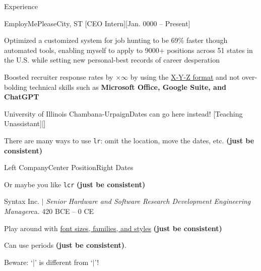 \documentclass[9pt]{extarticle} %
\begin{document}
\begin{sectionList}{Experience}
    \item \lr
    {EmployMePlease}{City, ST}
    [CEO Intern][Jan. 0000 -- Present]
    \begin{bullets}
        \item Optimized a customized system for job hunting to be 69\% faster though automated tools, enabling myself to apply to 9000+ positions across 51 states in the U.S. while setting new personal-best records of career desperation
        \item Boosted recruiter response rates by $\times \infty$ by using the \href{https://www.inc.com/bill-murphy-jr/google-recruiters-say-these-5-resume-tips-including-x-y-z-formula-will-improve-your-odds-of-getting-hired-at-google.html}{X-Y-Z format} and not over-bolding technical skills such as \textbf{Microsoft Office, Google Suite, and ChatGPT}
    \end{bullets}

    \item \lr
    {University of Illinois Chambana-Urpaign}{\textnormal{Dates can go here instead!}}
    [Teaching Unassistant][]
    \begin{bullets}
        \item There are many ways to use \texttt{lr}: omit the location, move the dates, etc. \textbf{(just be consistent)}
    \end{bullets}

    \item \lcr
    {Left Company}{Center Position}{Right Dates}
    \begin{bullets}
        \item Or maybe you like \texttt{lcr} \textbf{(just be consistent)}
    \end{bullets}

    \item \lr
    {Syntax Inc. $|$ \textnormal{\textit{Senior Hardware and Software Research Development Engineering Manager}}}{ca. 420 BCE -- 0 CE}
    \begin{bullets}
        \item Play around with \href{https://www.overleaf.com/learn/latex/Font_sizes%2C_families%2C_and_styles}{font sizes, families, and styles} \textbf{(just be consistent)}
        \item Can use periods \textbf{(just be consistent)}.
        \item Beware: `|' is different from `$\vert$'!
    \end{bullets}
\end{sectionList}
\end{document}
